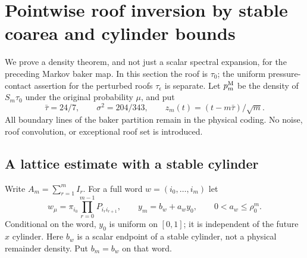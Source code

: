 \section{Pointwise roof inversion by stable coarea and cylinder bounds}
\label{sec:v59-stable-coarea}
We prove a density theorem, and not just a scalar spectral expansion, for
the preceding Markov baker map. In this section the roof is $\tau_0$;
the uniform pressure-contact assertion for the perturbed roofs
$\tau_\epsilon$ is separate. Let $p_m^{\rm M}$ be the density of
$S_m\tau_0$ under the original probability $\mu$, and put
\[
 \bar\tau=24/7,\qquad \sigma^2=204/343,\qquad
 z_m(t)=(t-m\bar\tau)/\sqrt m.
\]
All boundary lines of the baker partition remain in the physical
coding. No noise, roof convolution, or exceptional roof set is introduced.

\subsection{A lattice estimate with a stable cylinder}
Write $A_m=\sum_{r=1}^m I_r$. For a full word
$w=(i_0,\ldots,i_m)$ let
\[
 w_\mu=\pi_{i_0}\prod_{r=0}^{m-1}P_{i_ri_{r+1}},\qquad
 y_m=b_w+a_wy_0,\qquad 0<a_w\le\rho_0^m.
\]
Conditional on the word, $y_0$ is uniform on $[0,1]$; it is independent
of the future $x$ cylinder. Here $b_w$ is a scalar endpoint of a stable
cylinder, not a physical remainder density. Put $b_m=b_w$ on that word.


